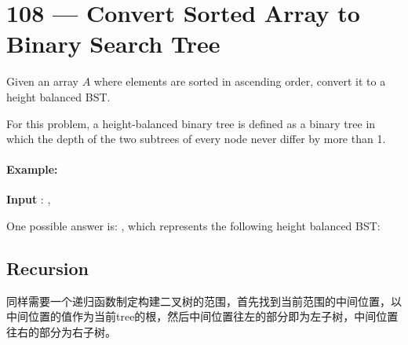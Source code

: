 \section{108 --- Convert Sorted Array to Binary Search Tree}
Given an array $A$ where elements are sorted in ascending order, convert it to a height balanced BST.

For this problem, a height-balanced binary tree is defined as a binary tree in which the depth of the two subtrees of every node never differ by more than 1.
\paragraph{Example:}
\begin{flushleft}
\textbf{Input} : ,


One possible answer is: \fcj{[0,-3,9,-10,null,5]}, which represents the following height balanced BST:

\begin{figure}[H]
\end{figure}



 \end{flushleft}
 \subsection{Recursion}
 同样需要一个递归函数制定构建二叉树的范围，首先找到当前范围的中间位置，以中间位置的值作为当前tree的根，然后中间位置往左的部分即为左子树，中间位置往右的部分为右子树。
